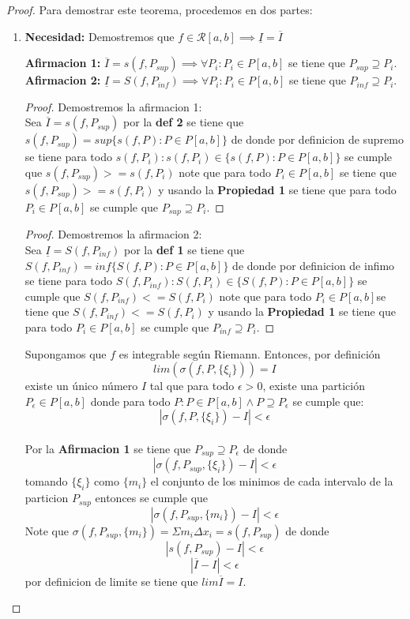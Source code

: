 \documentclass{article}
\begin{document}
\begin{proof}
Para demostrar este teorema, procedemos en dos partes:
\begin{enumerate}
    \item \textbf{Necesidad:} 
Demostremos que  \(f \in \mathcal{R}[a, b] \implies \underline{I} = \overline{I} \)

    \textbf{Afirmacion 1:} \(\overline{I} = s(f, P_{sup}) \implies \forall  P_i: P_i \in P[a,b]\) se tiene que \(P_{sup} \supseteq P_i\).\\
    \textbf{Afirmacion 2:} \(\underline{I} = S(f, P_{inf}) \implies \forall  P_i: P_i \in P[a,b]\) se tiene que \(P_{inf} \supseteq P_i\).
\begin{proof}
Demostremos la afirmacion 1:\\

Sea \(\overline{I} = s(f, P_{sup})\) por la \textbf{def 2} se tiene que \(s(f, P_{sup}) = sup\{ s(f, P): P \in P[a, b] \}\) de donde por definicion de supremo se tiene para todo \(  s(f, P_i): s(f, P_i) \in \{ s(f, P): P \in P[a, b] \}\)  se cumple que \(s(f, P_{sup}) >= s(f, P_i)\) note que para todo \(P_i \in P[a,b]\) se tiene que \(s(f, P_{sup}) >= s(f, P_i)\) y usando la \textbf{Propiedad 1} se tiene que para todo \(P_i \in P[a,b]\) se cumple que \( P_{sup} \supseteq P_i\).
\end{proof}

\begin{proof}
Demostremos la afirmacion 2:\\

Sea \(\underline{I} = S(f, P_{inf})\) por la \textbf{def 1} se tiene que \(S(f, P_{inf}) = inf\{ S(f, P): P \in P[a, b] \}\) de donde por definicion de infimo se tiene para todo \(  S(f, P_{inf}): S(f, P_i) \in \{ S(f, P): P \in P[a, b] \}\)  se cumple que \(S(f, P_{inf}) <= S(f, P_i)\) note que para todo \(P_i \in P[a,b]\)se tiene que \(S(f, P_{inf}) <= S(f, P_i)\) y usando la \textbf{Propiedad 1} se tiene que para todo \(P_i \in P[a,b]\) se cumple que \( P_{inf} \supseteq P_i\).
\end{proof}

 Supongamos que \( f \) es integrable según Riemann. Entonces, por definición
\[
lim(\sigma(f, P,\{\xi_i\})) = I
\]
existe un único número \( I \) tal que para todo \( \epsilon > 0 \), existe una partición \( P_\epsilon \in P[a, b]\)  donde para todo \( P: P \in P[a, b] \wedge P \supseteq P_\epsilon\) se cumple que:
    \[
    |\sigma(f, P,\{\xi_i\}) - I| < \epsilon
    \]\\
Por la \textbf{Afirmacion 1} se tiene que \(P_{sup} \supseteq P_\epsilon\) de donde 
\[
|\sigma(f, P_{sup},\{\xi_i\}) - I| < \epsilon
\]
tomando \(\{\xi_i\}\) como \(\{m_i\}\) el conjunto de los minimos de cada intervalo de la particion \(P_{sup}\) entonces se cumple que
\[
|\sigma(f, P_{sup},\{m_i\}) - I| < \epsilon
\]
Note que \(\sigma(f, P_{sup},\{m_i\}) = \Sigma m_i\Delta x_i = s(f, P_{sup})\) de donde
\[
|s(f, P_{sup}) - I| < \epsilon
\]
\[
|\overline{I} - I| < \epsilon
\]
por definicion de limite se tiene que \(lim\overline{I} = I\).\\


\end{enumerate}
\end{proof}
\end{document}
